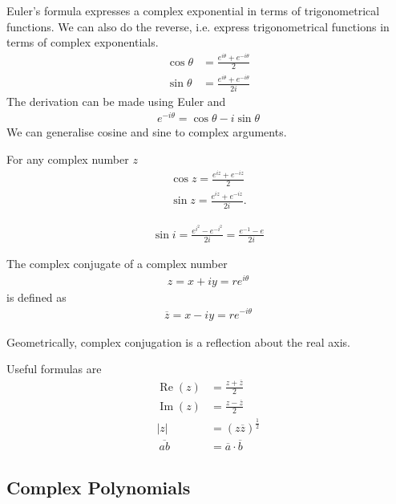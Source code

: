 Euler's formula expresses a complex exponential in terms of trigonometrical functions. We can also do the reverse, i.e. express trigonometrical functions in terms of complex exponentials.
\begin{align*}
\cos \theta & = \frac{e^{i \theta} + e^{-i \theta}} 2 \\
\sin \theta & = \frac{e^{i \theta} + e^{-i \theta}} {2i} 
\end{align*}
The derivation can be made using Euler and 
\begin{align*}
e^{- i \theta} = \cos \theta - i \sin \theta
\end{align*}
We can generalise cosine and sine to complex arguments.
\begin{df}
	For any complex number $z$ 
\begin{align*}
\cos z = \frac{e^{iz} + e^{-iz}} 2 \\
\sin z = \frac{e^{iz} + e^{-iz}} {2i}.
\end{align*}
\end{df}

\begin{ex}
	\begin{align*}
	\sin i = \frac{e^{i^2} - e^{-i^2}}{2i} = \frac {e^{-1} -e}{2i}
	\end{align*}
\end{ex}

\begin{df}
The complex conjugate of a complex number
\begin{align*}
z = x + iy = r e^{i \theta}
\end{align*}
is defined as
\begin{align*}
\overline z = x-iy = r e^{-i\theta}
\end{align*}
\end{df}

Geometrically, complex conjugation is a reflection about the real axis.

Useful formulas are
\begin{align*}
\operatorname{Re}(z) & = \frac{z + \overline z} 2 \\
\operatorname{Im}(z) & = \frac{z- \overline z} 2 \\
|z| & = (z \overline z)^{\frac 1 2} \\ \
\overline{ab} & = \overline a\cdot  \overline b
\end{align*}

\subsection{Complex Polynomials}

